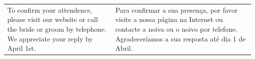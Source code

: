 \documentclass[10pt]{article}
\begin{document}
\pagestyle{empty}


\begin{tabular}{p{2in}|p{2in}}
  To confirm your attendence, please visit our website  or call the bride or groom by telephone. We appreciate your reply by April 1st.
  &
  Para confirmar a sua presença, por favor visite a nossa página na Internet ou contacte a noiva ou o noivo por telefone. Agradeceríamos a sua resposta até dia 1 de Abril.\\
\end{tabular}
\vspace{1in}

\end{document}
